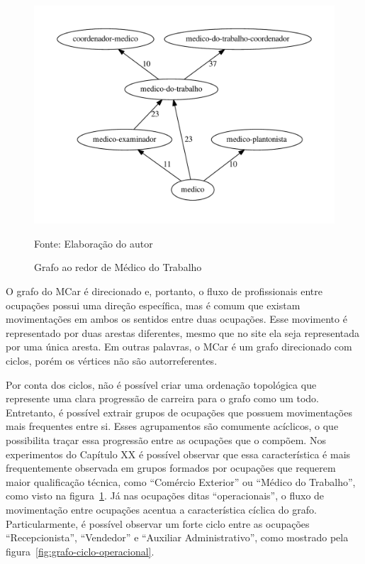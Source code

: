 \documentclass[12pt,a4paper]{article}
\theoremstyle{hypo}
\newcommand{\source}[1]{\vspace{-10pt} \caption*{Fonte: {#1}} }
\begin{document}
\begin{figure}[ht]
  \centering
  \includegraphics[scale=0.6]{cluster_24.pdf}
  \caption{Grafo ao redor de Médico do Trabalho}
  \source{Elaboração do autor}
  \label{fig:grafo-medico-do-trabalho}
\end{figure}

O grafo do MCar é direcionado e, portanto, o fluxo de profissionais entre ocupações possui uma direção específica, mas é comum que existam movimentações em ambos os sentidos entre duas ocupações. Esse movimento é representado por duas arestas diferentes, mesmo que no site ela seja representada por uma única aresta. Em outras palavras, o MCar é um grafo direcionado com ciclos, porém os vértices não são autorreferentes.

Por conta dos ciclos, não é possível criar uma ordenação topológica que represente uma clara progressão de carreira para o grafo como um todo. Entretanto, é possível extrair grupos de ocupações que possuem movimentações mais frequentes entre si. Esses agrupamentos são comumente acíclicos, o que possibilita traçar essa progressão entre as ocupações que o compõem. Nos experimentos do Capítulo XX é possível observar que essa característica é mais frequentemente observada em grupos formados por ocupações que requerem maior qualificação técnica, como \enquote{Comércio Exterior} ou \enquote{Médico do Trabalho}, como visto na figura~\ref{fig:grafo-medico-do-trabalho}. Já nas ocupações ditas \enquote{operacionais}, o fluxo de movimentação entre ocupações acentua a característica cíclica do grafo. Particularmente, é possível observar um forte ciclo entre as ocupações \enquote{Recepcionista}, \enquote{Vendedor} e \enquote{Auxiliar Administrativo}, como mostrado pela figura~\ref{fig:grafo-ciclo-operacional}.
\end{document}
